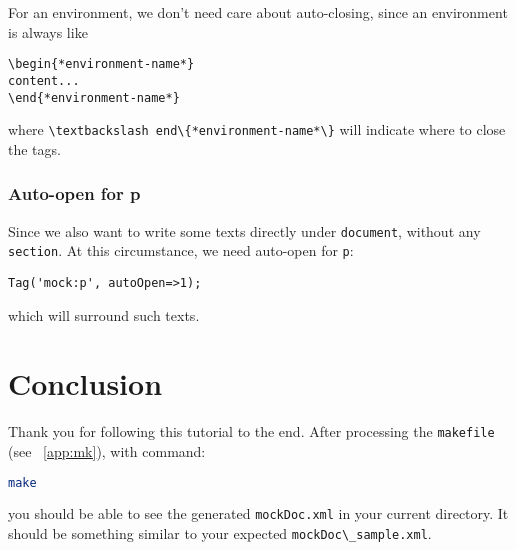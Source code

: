 \documentclass[a4paper]{article}
\begin{document}
 For an environment, we don't need care about auto-closing, since an environment is always like
\begin{lstlisting}
\begin{*environment-name*}
content...
\end{*environment-name*}
\end{lstlisting}
where \lstinline|\textbackslash end\{*environment-name*\}| will indicate where to close the tags.

\subsubsection{Auto-open for p}
Since we also want to write some texts directly under \lstinline|document|, without any \lstinline|section|. At this circumstance, we need auto-open for \lstinline|p|:
\begin{lstlisting}
Tag('mock:p', autoOpen=>1);
\end{lstlisting}
which will surround such texts.

\section{Conclusion}
Thank you for following this tutorial to the end. After processing the \lstinline|makefile|
(see ~\ref{app:mk}), with command:
\begin{lstlisting}[language=bash]
make
\end{lstlisting}
you should be able to see the generated \lstinline|mockDoc.xml| in your current directory. It
should be something similar to your expected \lstinline|mockDoc\_sample.xml|. 

\printbibliography
\newpage
\end{document}
